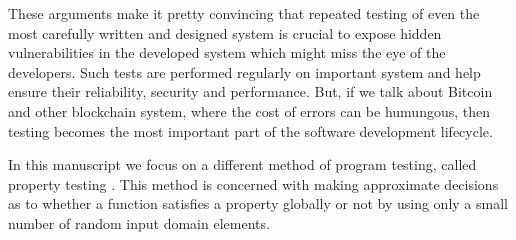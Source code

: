 These arguments make it pretty convincing that repeated testing of even the most carefully written and designed system is crucial to expose hidden vulnerabilities in the developed system which might miss the eye of the developers. Such tests are performed regularly on important system and help ensure their reliability, security and performance. But, if we talk about Bitcoin and other blockchain system, where the cost of errors can be humungous, then testing becomes the most important part of the software development lifecycle.

In this manuscript we focus on a different method of program testing, called property testing \cite{ron2001property}. This method is concerned with making approximate decisions as to whether a function satisfies a property globally or not by using only a small number of random input domain elements.
\nocite{holzmann1995improvement}
\nocite{zaki2008formal}





